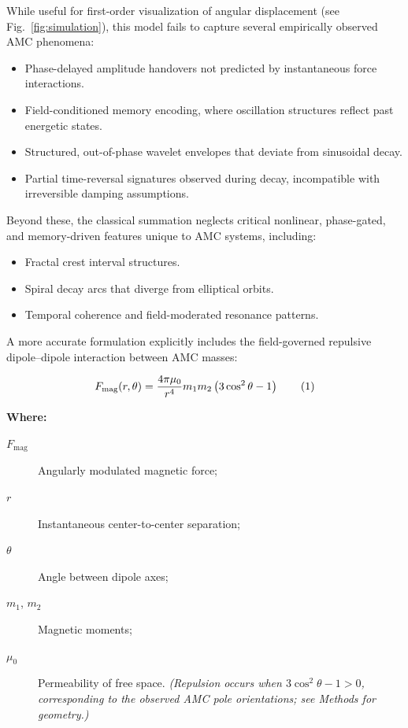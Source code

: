 \documentclass[10pt,aps,pre,onecolumn,superscriptaddress,notitlepage]{revtex4-2}
\begin{document}
While useful for first-order visualization of angular displacement (see Fig.~\ref{fig:simulation}), this model fails to capture several empirically observed AMC phenomena:
\begin{itemize}
    \item Phase-delayed amplitude handovers not predicted by instantaneous force interactions.
    \item Field-conditioned memory encoding, where oscillation structures reflect past energetic states.
    \item Structured, out-of-phase wavelet envelopes that deviate from sinusoidal decay.
    \item Partial time-reversal signatures observed during decay, incompatible with irreversible damping assumptions.
\end{itemize}
Beyond these, the classical summation neglects critical nonlinear, phase-gated, and memory-driven features unique to AMC systems, including:

\begin{itemize}
    \item Fractal crest interval structures.
    \item Spiral decay arcs that diverge from elliptical orbits.
    \item Temporal coherence and field-moderated resonance patterns.
\end{itemize}

A more accurate formulation explicitly includes the field-governed repulsive dipole–dipole interaction between AMC masses:

\begin{equation}
\refstepcounter{equation}
F_{\text{mag}}(r, \theta) = \frac{4 \pi \mu_0}{r^4} m_1 m_2 \left( 3\cos^2\theta - 1 \right)
\tag{\theequation}
\label{eq:mag_force}
\end{equation}


\textbf{Where:}
\begin{description}
    \item[$F_{\text{mag}}$] Angularly modulated magnetic force;
    \item[$r$] Instantaneous center-to-center separation;
    \item[$\theta$] Angle between dipole axes;
    \item[$m_1$, $m_2$] Magnetic moments;
    \item[$\mu_0$] Permeability of free space. \textit{(Repulsion occurs when $3\cos^2\theta - 1 > 0$, corresponding to the observed AMC pole orientations; see Methods for geometry.)}
\end{description}
\end{document}
